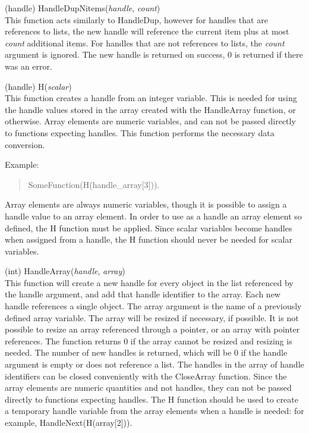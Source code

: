 \begin{description}
\item{(handle) \vt HandleDupNitems({\it handle\/}, {\it count\/})}\\
This function acts similarly to {\vt HandleDup}, however for handles
that are references to lists, the new handle will reference the
current item plus at most {\it count} additional items.  For handles
that are not references to lists, the {\it count} argument is ignored. 
The new handle is returned on success, 0 is returned if there was an
error.

\item{(handle) \vt H({\it scalar\/})}\\
This function creates a handle from an integer variable.  This is
needed for using the handle values stored in the array created with
the {\vt HandleArray} function, or otherwise.  Array elements are
numeric variables, and can not be passed directly to functions
expecting handles.  This function performs the necessary data
conversion.

Example:
\begin{quote}
{\vt SomeFunction(H(handle\_array[3]))}.
\end{quote}

Array elements are always numeric variables, though it is possible to
assign a handle value to an array element.  In order to use as a
handle an array element so defined, the {\vt H} function must be
applied.  Since scalar variables become handles when assigned from a
handle, the {\vt H} function should never be needed for scalar
variables.

\item{(int) \vt HandleArray({\it handle\/}, {\it array\/})}\\
This function will create a new handle for every object in the list
referenced by the handle argument, and add that handle identifier to
the array.  Each new handle references a single object.  The array
argument is the name of a previously defined array variable.  The
array will be resized if necessary, if possible.  It is not possible
to resize an array referenced through a pointer, or an array with
pointer references.  The function returns 0 if the array cannot be
resized and resizing is needed.  The number of new handles is
returned, which will be 0 if the handle argument is empty or does not
reference a list.  The handles in the array of handle identifiers can
be closed conveniently with the {\vt CloseArray} function.  Since the
array elements are numeric quantities and not handles, they can not be
passed directly to functions expecting handles.  The {\vt H} function
should be used to create a temporary handle variable from the array
elements when a handle is needed:  for example, {\vt
HandleNext(H(array[2]))}.


\end{description}
